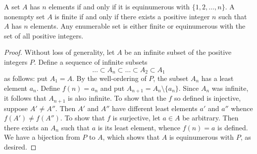 \begin{exercise}[1.4]
  A set $A$ has $n$ elements if and only if it is equinumerous with $\{1,2,\ldots,n\}$.
  A nonempty set $A$ is finite if and only if there exists a positive integer $n$ such that $A$ has $n$ elements.
  Any enumerable set is either finite or equinumerous with the set of all positive integers.
\end{exercise}
\begin{proof}
  Without loss of generality, let $A$ be an infinite subset of the positive integers $P$.
  Define a sequence of infinite subsets
  \begin{equation*}
    \ldots \subset A_n \subset \ldots \subset A_2 \subset A_1
  \end{equation*}
  as follows: put $A_1 = A$.
  By the well-ordering of $P$, the subset $A_n$ has a least element $a_n$.
  Define $f(n) = a_n$ and put $A_{n+1} = A_n \setminus \{a_n\}$.
  Since $A_n$ was infinite, it follows that $A_{n+1}$ is also infinite.
  To show that the $f$ so defined is injective, suppose $A' \ne A''$.
  Then $A'$ and $A''$ have different least elements $a'$ and $a''$ whence $f(A') \ne f(A'')$.
  To show that $f$ is surjective, let $a \in A$ be arbitrary.
  Then there exists an $A_n$ such that $a$ is its least element, whence $f(n) = a$ is defined.
  We have a bijection from $P$ to $A$, which shows that $A$ is equinumerous with $P$, as desired.
\end{proof}

